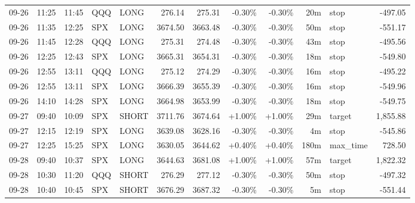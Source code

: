 \documentclass[11pt,a4paper,twoside]{article}
\begin{document}
\begin{center}
\begin{longtable}{>{\color{txtmain}}l l l l l r r r r r >{\color{txtmain}}l r}
09-26 & 11:25 & 11:45 & QQQ & LONG & 276.14 & 275.31 & \textcolor{lossred}{-0.30\%} & \textcolor{lossred}{-0.30\%} & 20m & stop & \textcolor{lossred}{-497.05} \\
09-26 & 11:35 & 12:25 & SPX & LONG & 3674.50 & 3663.48 & \textcolor{lossred}{-0.30\%} & \textcolor{lossred}{-0.30\%} & 50m & stop & \textcolor{lossred}{-551.17} \\
09-26 & 11:45 & 12:28 & QQQ & LONG & 275.31 & 274.48 & \textcolor{lossred}{-0.30\%} & \textcolor{lossred}{-0.30\%} & 43m & stop & \textcolor{lossred}{-495.56} \\
09-26 & 12:25 & 12:43 & SPX & LONG & 3665.31 & 3654.31 & \textcolor{lossred}{-0.30\%} & \textcolor{lossred}{-0.30\%} & 18m & stop & \textcolor{lossred}{-549.80} \\
09-26 & 12:55 & 13:11 & QQQ & LONG & 275.12 & 274.29 & \textcolor{lossred}{-0.30\%} & \textcolor{lossred}{-0.30\%} & 16m & stop & \textcolor{lossred}{-495.22} \\
09-26 & 12:55 & 13:11 & SPX & LONG & 3666.39 & 3655.39 & \textcolor{lossred}{-0.30\%} & \textcolor{lossred}{-0.30\%} & 16m & stop & \textcolor{lossred}{-549.96} \\
09-26 & 14:10 & 14:28 & SPX & LONG & 3664.98 & 3653.99 & \textcolor{lossred}{-0.30\%} & \textcolor{lossred}{-0.30\%} & 18m & stop & \textcolor{lossred}{-549.75} \\
09-27 & 09:40 & 10:09 & SPX & SHORT & 3711.76 & 3674.64 & \textcolor{wingreen}{+1.00\%} & \textcolor{wingreen}{+1.00\%} & 29m & target & \textcolor{wingreen}{1,855.88} \\
09-27 & 12:15 & 12:19 & SPX & LONG & 3639.08 & 3628.16 & \textcolor{lossred}{-0.30\%} & \textcolor{lossred}{-0.30\%} & 4m & stop & \textcolor{lossred}{-545.86} \\
09-27 & 12:25 & 15:25 & SPX & LONG & 3630.05 & 3644.62 & \textcolor{wingreen}{+0.40\%} & \textcolor{wingreen}{+0.40\%} & 180m & max\_time & \textcolor{wingreen}{728.50} \\
09-28 & 09:40 & 10:37 & SPX & LONG & 3644.63 & 3681.08 & \textcolor{wingreen}{+1.00\%} & \textcolor{wingreen}{+1.00\%} & 57m & target & \textcolor{wingreen}{1,822.32} \\
09-28 & 10:30 & 11:20 & QQQ & SHORT & 276.29 & 277.12 & \textcolor{lossred}{-0.30\%} & \textcolor{lossred}{-0.30\%} & 50m & stop & \textcolor{lossred}{-497.32} \\
09-28 & 10:40 & 10:45 & SPX & SHORT & 3676.29 & 3687.32 & \textcolor{lossred}{-0.30\%} & \textcolor{lossred}{-0.30\%} & 5m & stop & \textcolor{lossred}{-551.44} \\

\end{longtable}
\end{center}
\end{document}
